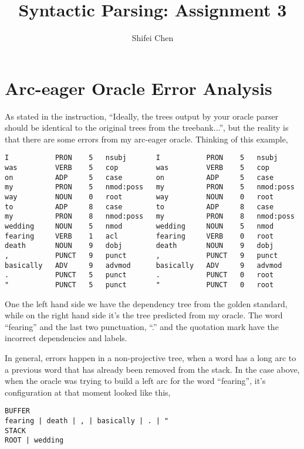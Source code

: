 \documentclass[11pt]{article} %
\title{{\LARGE Syntactic Parsing: Assignment 3}\\[1.5mm]} %
\author{Shifei Chen} %
\begin{document}
\maketitle

\section{Arc-eager Oracle Error Analysis}

As stated in the instruction, ``Ideally, the trees output by your oracle parser should be identical to the original trees from the treebank...'', but the reality is that there are some errors from my arc-eager oracle. Thinking of this example,

\begin{lstlisting}
I           PRON    5	nsubj       I           PRON    5   nsubj
was         VERB    5	cop         was         VERB    5   cop
on          ADP     5	case        on          ADP     5   case
my          PRON    5	nmod:poss   my          PRON    5   nmod:poss
way         NOUN    0	root        way         NOUN    0   root
to          ADP     8	case        to          ADP     8   case
my          PRON    8	nmod:poss   my          PRON    8   nmod:poss
wedding     NOUN    5	nmod        wedding     NOUN    5   nmod
fearing     VERB    1	acl         fearing     VERB    0   root
death       NOUN    9	dobj        death       NOUN    9   dobj
,           PUNCT   9	punct       ,           PUNCT   9   punct
basically   ADV     9	advmod      basically   ADV     9   advmod
.           PUNCT   5	punct       .           PUNCT   0   root
"           PUNCT   5	punct       "           PUNCT   0   root    
\end{lstlisting}

One the left hand side we have the dependency tree from the golden standard, while on the right hand side it's the tree predicted from my oracle. The word ``fearing'' and the last two punctuation, ``.'' and the quotation mark have the incorrect dependencies and labels.

In general, errors happen in a non-projective tree, when a word has a long arc to a previous word that has already been removed from the stack. In the case above, when the oracle was trying to build a left arc for the word ``fearing'', it's configuration at that moment looked like this,

\begin{lstlisting}
BUFFER
fearing | death | , | basically | . | "
STACK
ROOT | wedding
\end{lstlisting}
\end{document}
